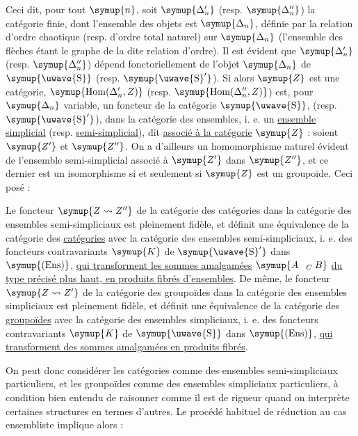 Ceci dit, pour tout $\symup{n}$, soit $\symup{\Delta'_n}$ (resp. $\symup{\Delta''_n}$) la catégorie
finie, dont l'ensemble des objets est $\symup{\Delta_n}$, définie par la relation
d'ordre chaotique (resp. d'ordre total naturel) sur $\symup{\Delta_n}$ (l'ensemble
des flèches étant le graphe de la dite relation d'ordre). Il est évident que
$\symup{\Delta'_n}$ (resp. $\symup{\Delta''_n}$) dépend fonctoriellement de l'objet $\symup{\Delta_n}$
de $\symup{\text{\uwave{S}}}$ (resp. $\symup{\text{\uwave{S}}'}$). Si alors $\symup{Z}$ est une catégorie,
$\symup{\operatorname{Hom}(\Delta'_n,Z)}$ (resp.
$\symup{\operatorname{Hom}(\Delta''_n,Z)}$) est, pour $\symup{\Delta_n}$ variable, un foncteur
de la catégorie $\symup{\text{\uwave{S}}}$, (resp. $\symup{\text{\uwave{S}}'}$), dans la catégorie des
ensembles, i. e. un \uline{ensemble simplicial} (resp. \uline{semi-simplicial}), dit
\uline{associé à la catégorie} $\symup{Z}$ : soient $\symup{Z'}$ et $\symup{Z''}$. On a d'ailleurs un
homomorphisme naturel évident de l'ensemble semi-simplicial associé à $\symup{Z'}$
dans $\symup{Z''}$, et ce dernier est un isomorphisme si et seulement si $\symup{Z}$ est un
groupoïde. Ceci posé :

 Le foncteur $\symup{Z\rightsquigarrow Z''}$ de la catégorie des
catégories dans la catégorie des ensembles semi-simpliciaux est pleinement
fidèle, et définit une équivalence de la catégorie des \uline{catégories} avec
la catégorie des ensembles semi-simpliciaux, i. e. des foncteurs contravariants
$\symup{K}$ de $\symup{\text{\uwave{S}}'}$ dans $\symup{(\mathrm{Ens})}$, \uline{qui transforment les sommes amalgamées} $\symup{A\mathbin{\phantom{\mathrm{n}}}_C B}$ \uline{du type précisé plus haut, en produits fibrés d'ensembles}. De même, le foncteur $\symup{Z\rightsquigarrow Z'}$ de la catégorie des
groupoïdes dans la catégorie des ensembles simpliciaux est pleinement fidèle,
et définit une équivalence de la catégorie des \uline{groupoïdes} avec la
catégorie des
ensembles simpliciaux, i. e. des foncteurs contravariants $\symup{K}$ de $\symup{\text{\uwave{S}}}$
dans $\symup{(\mathrm{Ens})}$, \uline{qui transforment des sommes amalgamées en produits fibrés}.

On peut donc considérer les catégories comme des ensembles semi-simpliciaux
particuliers, et les groupoïdes comme des ensembles simpliciaux particuliers,
à condition bien entendu de raisonner  comme il est
de rigueur quand on interprète certaines structures en termes d'autres. Le
procédé habituel de réduction au cas ensembliste implique alors :

